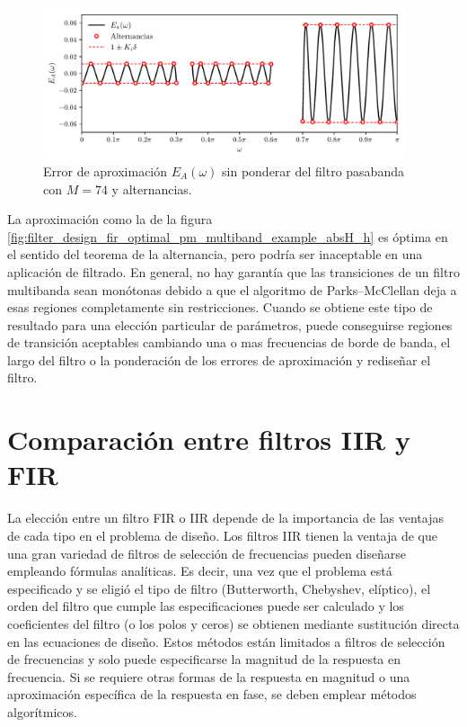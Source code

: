 \documentclass[a4paper]{report}
\begin{document}
\begin{figure}[!htb]
 \begin{center}
 \includegraphics[width=0.95\textwidth]{figuras/filter_design_fir_optimal_pm_multiband_example_aprox_error.pdf}
 \caption{\label{fig:filter_design_fir_optimal_pm_multiband_example_aprox_error} Error de aproximación \(E_A(\omega)\) sin ponderar del filtro pasabanda con \(M=74\) y alternancias.}
 \end{center}
\end{figure}

La aproximación como la de la figura \ref{fig:filter_design_fir_optimal_pm_multiband_example_absH_h} es óptima en el sentido del teorema de la alternancia, pero podría ser inaceptable en una aplicación de filtrado. En general, no hay garantía que las transiciones de un filtro multibanda sean monótonas debido a que el algoritmo de Parks--McClellan deja a esas regiones completamente sin restricciones. Cuando se obtiene este tipo de resultado para una elección particular de parámetros, puede conseguirse regiones de transición aceptables cambiando una o mas frecuencias de borde de banda, el largo del filtro o la ponderación de los errores de aproximación y rediseñar el filtro. 

\section{Comparación entre filtros IIR y FIR}

La elección entre un filtro FIR o IIR depende de la importancia de las ventajas de cada tipo en el problema de diseño. Los filtros IIR tienen la ventaja de que una gran variedad de filtros de selección de frecuencias pueden diseñarse empleando fórmulas analíticas. Es decir, una vez que el problema está especificado y se eligió el tipo de filtro (Butterworth, Chebyshev, elíptico), el orden del filtro que cumple las especificaciones puede ser calculado y los coeficientes del filtro (o los polos y ceros) se obtienen mediante sustitución directa en las ecuaciones de diseño. Estos métodos están limitados a filtros de selección de frecuencias y solo puede especificarse la magnitud de la respuesta en frecuencia. Si se requiere otras formas de la respuesta en magnitud o una aproximación específica de la respuesta en fase, se deben emplear métodos algorítmicos.
\end{document}
